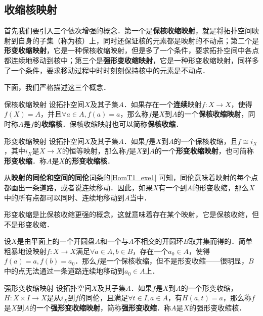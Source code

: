 
\subsection{收缩核映射}

首先我们要引入三个依次增强的概念．第一个是\textbf{保核收缩映射}，就是将拓扑空间映射到自身的子集（称为核）上，同时还保证核的元素都是映射的不动点；第二个是\textbf{形变收缩映射}，它是一种保核收缩映射，但是多了一个条件，要求拓扑空间中各点都连续地移动到核中；第三个是\textbf{强形变收缩映射}，它是一种形变收缩映射，同样多了一个条件，要求移动过程中时时刻刻保持核中的元素是不动点．

下面，我们严格描述这三个概念．

\begin{definition}{保核收缩映射}
设拓扑空间$X$及其子集$A$．如果存在一个\textbf{连续}映射$f:X\rightarrow X$，使得$f(X)=A$，并且$\forall a\in A, f(a)=a$，那么称$f$是$X$到$A$的一个\textbf{保核收缩映射}，同时称$A$是$f$的\textbf{收缩核}．保核收缩映射也可以简称\textbf{保核收缩}．
\end{definition}

\begin{definition}{形变收缩映射}
设拓扑空间$X$及其子集$A$．如果$f$是$X$到$A$的一个保核收缩，且$f\cong i_X$，其中$i_X$是$X\rightarrow X$的恒等映射，那么称$f$是$X$到$A$的一个\textbf{形变收缩映射}，也可简称\textbf{形变收缩}．称$A$是$X$的\textbf{形变收缩核}．
\end{definition}

从\textbf{映射的同伦和空间的同伦}词条的\autoref{HomT1_exe1} 可知，同伦意味着映射的每个点都画出一条道路，或者说连续移动．因此，如果$X$有一个到$A$的形变收缩，那么$X$中的所有点都可以同时、连续地移动到$A$当中．

形变收缩是比保核收缩更强的概念，这就意味着存在某个映射，它是保核收缩，但不是形变收缩．

\begin{example}{}
设$X$是由平面上的一个开圆盘$A$和一个与$A$不相交的开圆环$B$取并集而得的．简单粗暴地设映射$f:X\rightarrow X$满足$\forall a\in A, b\in B$，存在一个$a_0\in A$，使得$f(a)=a, f(b)=a_0$．那么$f$是一个保核收缩，但不是形变收缩——很明显，$B$中的点无法通过一条道路连续地移动到$a_0\in A$上．
\end{example}

\begin{definition}{强形变收缩映射}
设拓扑空间$X$及其子集$A$．如果$f$是$X$到$A$的一个形变收缩，$H:X\times I\rightarrow X$是从$i_X$到$f$的同伦，且满足$\forall t\in I, a\in A$，有$H(a, t)=a$，那么称$f$是$X$到$A$的一个\textbf{强形变收缩映射}，简称\textbf{强形变收缩}．称$A$是$X$的强形变收缩核．
\end{definition}

